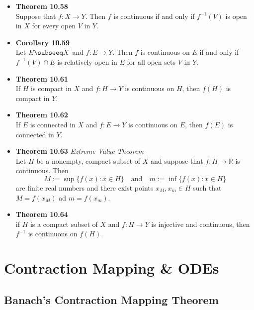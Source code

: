 \documentclass[11pt,a4paper]{article}
\begin{document}
\begin{itemize}
    \item \textbf{Theorem 10.58} \\
        Suppose that $f : X \to Y$.
        Then $f$ is continuous if and only if $f^{-1} (V)$ is open in $X$ for every open
        $V$ in $Y$.

    \item \textbf{Corollary 10.59} \\
        Let $E \subseeq X$ and $f : E \to Y$.
        Then $f$ is continuous on $E$ if and only if $f^{-1}(V) \cap E$ is relatively
        open in $E$ for all open sets $V$ in $Y$.

    \item \textbf{Theorem 10.61} \\
        If $H$ is compact in $X$ and $f : H \to Y$ is continuous on $H$,
        then $f(H)$ is compact in $Y$.

    \item \textbf{Theorem 10.62} \\
        If $E$ is connected in $X$ and $f : E \to Y$ is continuous on $E$,
        then $f(E)$ is connected in $Y$.

    \item \textbf{Theorem 10.63} \emph{Extreme Value Theorem} \\
        Let $H$ be a nonempty, compact subset of $X$ and suppose that $f : H \to \mathbb{R}$
        is continuous.
        Then
        \[
            M := \sup \{ f(x) : x \in H \} \quad \text{and} \quad
            m := \inf \{ f(x) : x \in H \}
        \]
        are finite real numbers and there exist points $x_M, x_m \in H$ such that
        $M = f(x_M)$ ad $m = f(x_m)$.

    \item \textbf{Theorem 10.64} \\
        if $H$ is a compact subset of $X$ and $f : H \to Y$ is injective and continuous,
        then $f^{-1}$ is continuous on $f(H)$.

\end{itemize}

\break{}

\section{Contraction Mapping \& ODEs}

\subsection{Banach's Contraction Mapping Theorem}
\end{document}

